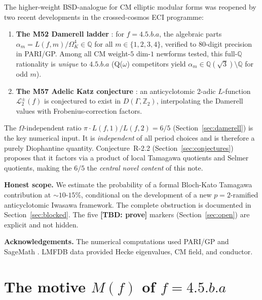 \documentclass[12pt]{amsart}
\theoremstyle{definition}
\newcommand{\Z}{\mathbb{Z}}
\newcommand{\Q}{\mathbb{Q}}
\begin{document}
\medskip
The higher-weight BSD-analogue for CM elliptic modular forms was reopened
by two recent developments in the crossed-cosmos ECI programme:
\begin{enumerate}[label=(\roman*)]
\item \textbf{The M52 Damerell ladder} \cite{Dam70,Dam71}: for $f = 4.5.b.a$,
  the algebraic parts $\alpha_m = L(f,m)/\Omega_K^{4} \in \Q$ for all
  $m \in \{1,2,3,4\}$, verified to 80-digit precision in PARI/GP.
  Among all CM weight-$5$ dim-$1$ newforms tested, this full-$\Q$ rationality
  is \emph{unique} to $4.5.b.a$ (Q($\omega$) competitors yield $\alpha_m \in \Q(\sqrt{3}) \setminus \Q$ for odd $m$).

\item \textbf{The M57 Adelic Katz conjecture} \cite{Katz78,Kriz21}:
  an anticyclotomic 2-adic $L$-function $\mathscr{L}_2^\pm(f)$
  is conjectured to exist in $D(\Gamma, \Z_2)$, interpolating the Damerell
  values with Frobenius-correction factors.
\end{enumerate}

\medskip
The $\Omega$-independent ratio $\pi \cdot L(f,1)/L(f,2) = 6/5$
(Section~\ref{sec:damerell}) is the key numerical input. It is \emph{independent}
of all period choices and is therefore a purely Diophantine quantity.
Conjecture~R-2.2 (Section~\ref{sec:conjectures}) proposes that it factors
via a product of local Tamagawa quotients and Selmer quotients, making the $6/5$
the \emph{central novel content} of this note.

\medskip
\textbf{Honest scope.} We estimate the probability of a formal Bloch-Kato
Tamagawa contribution at $\sim 10$-$15\%$, conditional on
the development of a new $p=2$-ramified anticyclotomic Iwasawa framework.
The complete obstruction is documented in Section~\ref{sec:blocked}.
The five \textbf{[TBD: prove]} markers (Section~\ref{sec:open}) are explicit
and not hidden.

\medskip
\textbf{Acknowledgements.} The numerical computations used PARI/GP \cite{PARI}
and SageMath \cite{Sage}. LMFDB data \cite{LMFDB} provided Hecke eigenvalues,
CM field, and conductor.

\section{The motive \texorpdfstring{$M(f)$}{M(f)} of \texorpdfstring{$f = 4.5.b.a$}{f = 4.5.b.a}}
\label{sec:motive}
\end{document}
